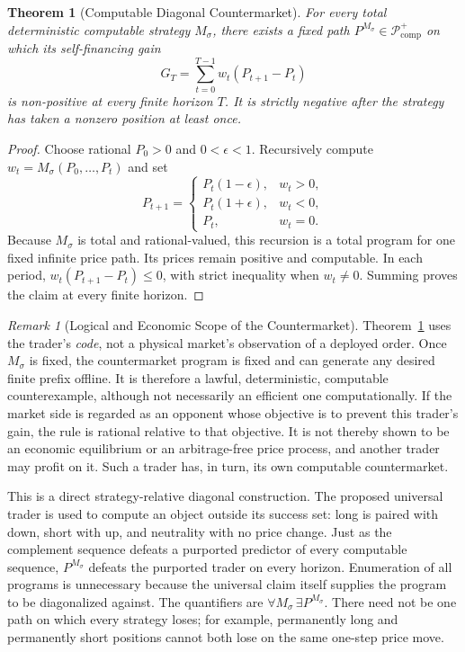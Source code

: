 \documentclass[aps,pra,reprint,superscriptaddress,amsmath,amssymb,floatfix]{revtex4-2}
\theoremstyle{plain}
\newtheorem{theorem}{Theorem}
\theoremstyle{definition}
\theoremstyle{remark}
\newtheorem{remark}{Remark}
\begin{document}
\begin{samepage}
\begin{theorem}[Computable Diagonal Countermarket]
  \label{thm:counterpath}
  For every total deterministic computable strategy \(M_\sigma\), there exists
  a fixed path \(P^{M_\sigma}\in\mathcal P_{\mathrm{comp}}^{+}\) on which its
  self-financing gain
  \[
    G_T=\sum_{t=0}^{T-1}w_t(P_{t+1}-P_t)
  \]
  is non-positive at every finite horizon \(T\). It is strictly negative after
  the strategy has taken a nonzero position at least once.
\end{theorem}
\end{samepage}

\begin{proof}
Choose rational \(P_0>0\) and \(0<\epsilon<1\). Recursively compute
\(w_t=M_\sigma(P_0,\ldots,P_t)\) and set
\begin{equation}
P_{t+1}=
\begin{cases}
P_t(1-\epsilon),&w_t>0,\\
P_t(1+\epsilon),&w_t<0,\\
P_t,&w_t=0.
\end{cases}
\label{eq:adversary}
\end{equation}
Because \(M_\sigma\) is total and rational-valued, this recursion is a total
program for one fixed infinite price path. Its prices remain positive and
computable. In each period,
\(w_t(P_{t+1}-P_t)\leq0\), with strict inequality when \(w_t\neq0\).
Summing proves the claim at every finite horizon.
\end{proof}

\begin{remark}[Logical and Economic Scope of the Countermarket]
\label{rem:counterpath-scope}
Theorem~\ref{thm:counterpath} uses the trader's \emph{code}, not a physical
market's observation of a deployed order. Once \(M_\sigma\) is fixed, the
countermarket program is fixed and can generate any desired finite prefix
offline. It is therefore a lawful, deterministic, computable counterexample,
although not necessarily an efficient one computationally. If the market side
is regarded as an opponent whose objective is to prevent this trader's gain,
the rule is rational relative to that objective. It is not thereby shown to be
an economic equilibrium or an arbitrage-free price process, and another trader
may profit on it. Such a trader has, in turn, its own computable countermarket.
\end{remark}

This is a direct strategy-relative diagonal construction. The proposed
universal trader is used to compute an object outside its success set: long is
paired with down, short with up, and neutrality with no price change. Just as
the complement sequence defeats a purported predictor of every computable
sequence, \(P^{M_\sigma}\) defeats the purported trader on every horizon.
Enumeration of all programs is unnecessary because the universal claim itself
supplies the program to be diagonalized against. The quantifiers are
\(\forall M_\sigma\,\exists P^{M_\sigma}\). There need not be one path on
which every strategy loses; for example, permanently long and permanently
short positions cannot both lose on the same one-step price move.
\end{document}

